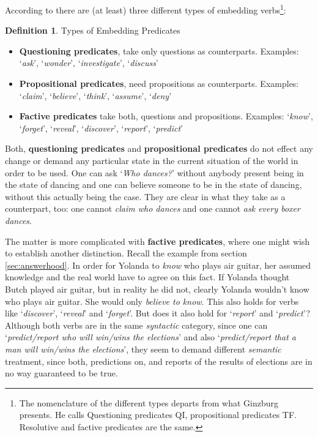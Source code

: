 \documentclass[notitlepage,twoside,a4paper]{scrreprt}
\newcommand{\term}[1]{\textsf{\textbf{#1}}} %
\newcommand{\example}[1]{`\textit{#1}'} %
\theoremstyle{remark}
\theoremstyle{remark}
\theoremstyle{definition}
\newtheorem{definition}[thm]{Definition}
\theoremstyle{definition}
\begin{document}
According to \cite{ginzburg} there are (at least) three different types of
embedding verbs\footnote{The nomenclature of the different types departs from
what Ginzburg presents. He calls Questioning predicates QI, propositional
predicates TF. Resolutive and factive predicates are the same.}:

\begin{definition}\label{def:embed1}
  Types of Embedding Predicates
\begin{itemize}
  \item \term{Questioning predicates}, take only questions as counterparts.
  Examples: \example{ask}, \example{wonder}, \example{investigate},
  \example{discuss}
  \item \term{Propositional predicates}, need propositions as counterparts.
  Examples: \example{claim}, \example{believe}, \example{think},
  \example{assume}, \example{deny}
  \item \term{Factive predicates} take both, questions and propositions.
  Examples:
  \example{know}, \example{forget}, \example{reveal}, \example{discover},
  \example{report}, \example{predict}
\end{itemize}
\end{definition}

Both, \term{questioning predicates} and \term{propositional predicates} do not
effect any change or demand any particular state in the current situation of the
world in order to be used. One can ask \example{Who dances?} without anybody
present being in the state of dancing and one can believe someone to be in the
state of dancing, without this actually being the case. They are clear in what
they take as a counterpart, too: one cannot \emph{claim who dances} and one
cannot \emph{ask every boxer dances}.

The matter is more complicated with \term{factive predicates}, where
one might wish to establish another distinction. Recall the example from section
\ref{sec:answerhood}. In order for Yolanda to \emph{know} who plays air guitar,
her assumed knowledge and the real world have to agree on this fact. If Yolanda
thought Butch played air guitar, but in reality he did not, clearly Yolanda
wouldn't know who plays air guitar. She would only \emph{believe to know}.
This also holds for
verbs like \example{discover}, \example{reveal} and \example{forget}. But does
it also hold for \example{report} and \example{predict}? Although both verbs are
in the same \emph{syntactic} category, since one can \example{predict/report who will
win/wins the elections} and also \example{predict/report that a man will
win/wins the elections}, they seem to demand different \emph{semantic}
treatment, since both, predictions on, and reports of the results of elections are
in no way guaranteed to be true.
\end{document}
